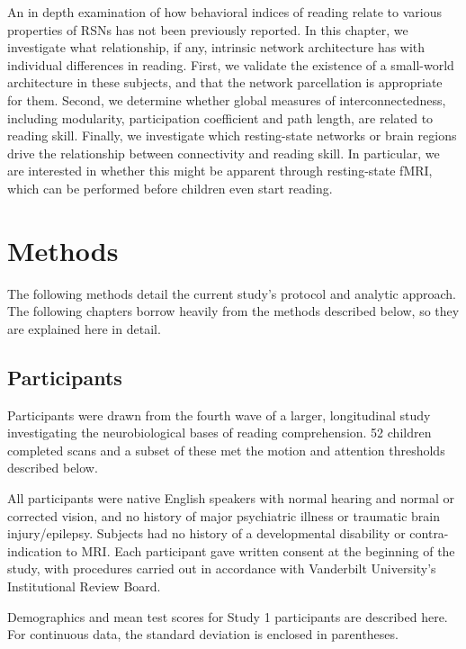 An in depth examination of how behavioral indices of reading relate to various properties of RSNs has not been previously reported. In this chapter, we investigate what relationship, if any, intrinsic network architecture has with individual differences in reading. First, we validate the existence of a small-world architecture in these subjects, and that the network parcellation is appropriate for them. Second, we determine whether global measures of interconnectedness, including modularity, participation coefficient and path length, are related to reading skill. Finally, we investigate which resting-state networks or brain regions drive the relationship between connectivity and reading skill. In particular, we are interested in whether this might be apparent through resting-state fMRI, which can be performed before children even start reading.


\section{Methods}

The following methods detail the current study's protocol and analytic approach. The following chapters borrow heavily from the methods described below, so they are explained here in detail. 

\subsection{Participants}

Participants were drawn from the fourth wave of a larger, longitudinal study investigating the neurobiological bases of reading comprehension. 52 children completed scans and a subset of these met the motion and attention thresholds described below.

All participants were native English speakers with normal hearing and normal or corrected vision, and no history of major psychiatric illness or traumatic brain injury/epilepsy. Subjects had no history of a developmental disability or contra-indication to MRI.  Each participant gave written consent at the beginning of the study, with procedures carried out in accordance with Vanderbilt University’s Institutional Review Board.

\begin{table}
    \renewcommand{\tabcolsep}{0.09cm}
    \centering
    
    \caption[Participant demographics]{Demographics and mean test scores for Study 1 participants are described here. For continuous data, the standard deviation is enclosed in parentheses.}
    \label{table:ch2-participants}
\end{table}

